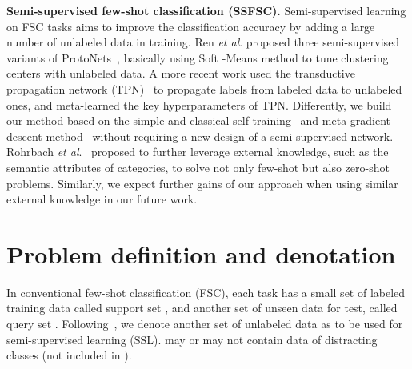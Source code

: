 \documentclass{article}
\newcommand{\myparagraph}[1]{\vspace{0.1em}\noindent\textbf{#1}}
\begin{document}
\myparagraph{Semi-supervised few-shot classification (SSFSC).}
Semi-supervised learning on FSC tasks aims to improve the classification accuracy by adding a large number of unlabeled data in training.
Ren \emph{et al}. proposed three semi-supervised variants of ProtoNets~\cite{SnellSZ17}, basically using Soft -Means method to tune clustering centers with unlabeled data.
A more recent work used
the transductive propagation network (TPN)~\cite{LiuICLR2019transductive} to propagate labels from labeled data to unlabeled ones, and
meta-learned the key hyperparameters of TPN.
Differently, we build our method based on the simple and classical self-training~\cite{Yarowsky95self_training} and meta gradient descent method~\cite{FinnAL17, SunCVPR2019} without requiring a new design of a semi-supervised network.
Rohrbach \emph{et al}.~\cite{RohrbachNIPS13transfer} proposed to further leverage external knowledge, such as the semantic attributes of categories, to solve not only few-shot but also zero-shot problems. Similarly, we expect further gains of our approach when using similar external knowledge in our future work.



\section{Problem definition and denotation}

In conventional few-shot classification (FSC), each task has a small set of labeled training data called support set , and another set of unseen data for test, called query set . 
Following~\cite{RenICLR2018_semisupervised}, we denote another set of unlabeled data as  to be used for semi-supervised learning (SSL).  may or may not contain data of distracting classes (not included in ).
\end{document}
